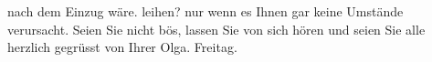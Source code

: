 \begin{ledgroupsized}[t]{13cm}
{{{                  nach dem Einzug wäre.}}}\label{K_L01795_1h} leihen? nur wenn es Ihnen gar keine Umstände
               verursacht.\pend
           \pstart
           Seien Sie nicht bös, lassen Sie {\pb}von sich hören und
               seien Sie alle herzlich gegrüsst von Ihrer\pend
           \pstart \spacefill\mbox{Olga.}\pend{}\pstart
           Freitag.\pend
           \endnumbering{}\end{ledgroupsized}  \newcommand{\dateiname}{L01795}\newcommand{\titel}{Olga Schnitzler an Paula Beer-Hofmann, [23. 10. 1908?]}\newcommand{\editorInnen}{Martin Anton Müller und Gerd-Hermann Susen}
      